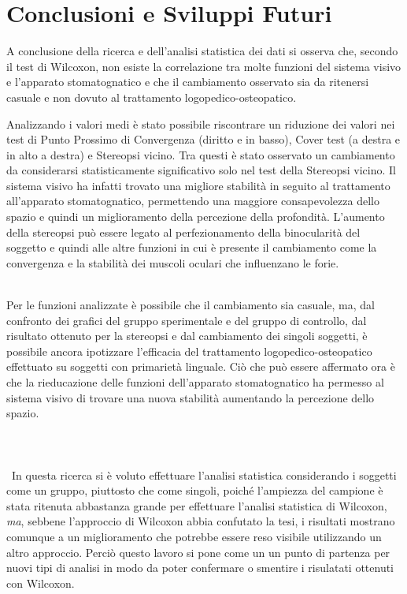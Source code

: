 \chapter{Conclusioni e Sviluppi Futuri}

A conclusione della ricerca e dell’analisi statistica dei dati si osserva che, secondo il test di Wilcoxon, non esiste la correlazione tra molte funzioni del sistema visivo e l’apparato stomatognatico e che il cambiamento osservato sia da ritenersi casuale e non dovuto al trattamento logopedico-osteopatico.
 
Analizzando i valori medi è stato possibile riscontrare un riduzione dei valori nei test di Punto Prossimo di Convergenza (diritto e in basso), Cover test (a destra e in alto a destra) e Stereopsi vicino. Tra questi è stato osservato un cambiamento da considerarsi statisticamente significativo solo nel test della Stereopsi vicino. Il sistema visivo ha infatti trovato una migliore stabilità in seguito al trattamento all’apparato stomatognatico, permettendo una maggiore consapevolezza dello spazio e quindi un miglioramento della percezione della profondità. L’aumento della stereopsi può essere legato al perfezionamento della binocularità del soggetto e quindi alle altre funzioni in cui è presente il cambiamento come la convergenza e la stabilità dei muscoli oculari che influenzano le forie.
\\\

Per le funzioni analizzate è possibile che il cambiamento sia casuale, ma, dal confronto dei grafici del gruppo sperimentale e del gruppo di controllo, dal risultato ottenuto per la stereopsi e dal cambiamento dei singoli soggetti, è possibile ancora ipotizzare l’efficacia del trattamento logopedico-osteopatico effettuato su soggetti con primarietà linguale. Ciò che può essere affermato ora è che la rieducazione delle funzioni dell’apparato stomatognatico ha permesso al sistema visivo di trovare una nuova stabilità aumentando la percezione dello spazio.
\\\ \\\ \\\ \\\
In questa ricerca si è voluto effettuare l’analisi statistica considerando i soggetti come un gruppo, piuttosto che come singoli, poiché l’ampiezza del campione è stata ritenuta abbastanza grande per effettuare l’analisi statistica di Wilcoxon, \emph{ma}, sebbene l’approccio di  Wilcoxon  abbia confutato la tesi, i risultati mostrano comunque a un miglioramento che potrebbe essere reso visibile utilizzando un altro approccio. Perciò questo lavoro si pone come un un punto di partenza per nuovi tipi di analisi in modo da poter confermare o smentire i risulatati ottenuti con Wilcoxon.
\\\ \\\ \\\ \\\
